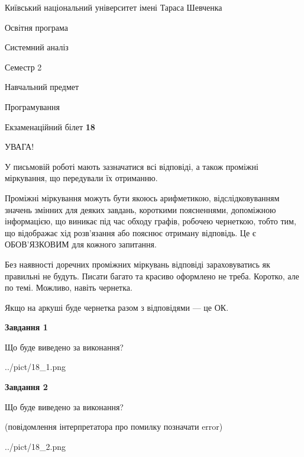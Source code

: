 \documentclass[12pt, ukrainian]{article}
\begin{document}
{{\begin {small}\par
{ \center  Київський національний університет імені Тараса Шевченка \par}
{\parbox {5 cm}{Освітня програма \hfill}{\parbox {7 cm}{Системний аналіз \hfill}}\parbox {6 cm}{\hfill Семестр 2}}\par
{\parbox {5 cm} {Навчальний предмет \hfill}\parbox {7 cm}{Програмування \hfill}\parbox {6cm}{\hfill}\par}\vspace{-7pt} \end{small}}{\center Екзаменаційний білет \No \textbf
{ 18 }\par}}
{
\begin {large}
УВАГА!

У письмовій роботі мають зазначатися всі відповіді, а також проміжні міркування, що передували їх отриманню.

Проміжні міркування можуть бути якоюсь арифметикою, відслідковуванням зна\-чень змінних для деяких завдань,
короткими поясненнями, допоміжною інформацією, що виникає під час обходу графів, робочею чернеткою,
тобто тим, що відображає хід розв’язання або пояснює отриману відповідь.
Це є ОБОВ’ЯЗКОВИМ для кожного запитання.

Без наявності доречних проміжних міркувань відповіді зараховуватись як правиль\-ні не будуть.
Писати багато та красиво оформлено не треба. Коротко, але по темі. Можли\-во, навіть чернетка.

Якщо на аркуші буде чернетка разом з відповідями --- це ОК.

\newpage

{\begin {center}\textbf{Завдання 1}\end {center}}\par
Що буде виведено за виконання?\par
\begin{center}
	{../pict/18_1.png}
\end{center}
\newpage

{\begin {center}\textbf{Завдання 2}\end {center}}\par
Що буде виведено за виконання?\par
 (повідомлення інтерпретатора про помилку позначати error)\par
\begin{center}
	{../pict/18_2.png}
\end{center}
\newpage


\end{large}}
\end{document}
